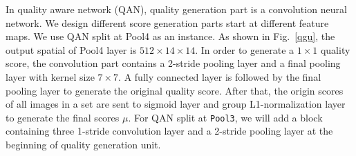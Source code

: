 In quality aware network (QAN), quality generation part is a  convolution neural network. We design different score generation parts start at different feature maps. We use QAN split at Pool4 as an instance. As shown in Fig.~\ref{qgu}, the output spatial of Pool4 layer is $512\times14\times14$. In order to generate a $1\times1$ quality score, the convolution part contains a 2-stride pooling layer and a final pooling layer with kernel size $7\times7$. A fully connected layer is followed by the final pooling layer to generate the original quality score. After that, the origin scores of all images in a set are sent to sigmoid layer and group L1-normalization layer to generate the final scores $\mu$. For QAN split at \texttt{Pool3}, we will add a block containing three 1-stride convolution layer and a 2-stride pooling layer at the beginning of quality generation unit.
